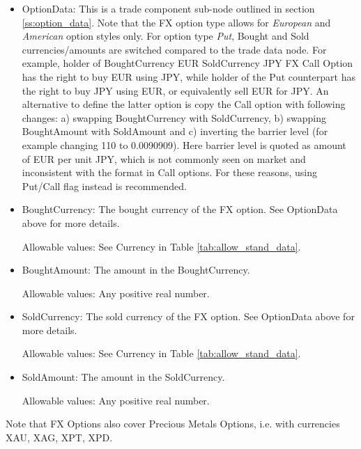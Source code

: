 \begin{itemize}
\item OptionData: This is a trade component sub-node outlined in section \ref{ss:option_data}. Note that the
  FX option type allows for \emph{European} and \emph{American} option styles only. For option type \emph{Put}, Bought and Sold currencies/amounts are switched compared to the trade data node.
For example, holder of BoughtCurrency EUR SoldCurrency JPY FX Call Option has the right to buy EUR using JPY, while
holder of the Put counterpart has the right to buy JPY using EUR, or equivalently sell EUR for JPY. An alternative to define the latter option is copy the Call option with following changes:
a) swapping BoughtCurrency with SoldCurrency, b) swapping BoughtAmount with SoldAmount and c) inverting the barrier level (for example changing 110 to 0.0090909). Here barrier level is
quoted as amount of EUR per unit JPY, which is not commonly seen on market and inconsistent with the format in Call options. For these reasons, using Put/Call flag instead is recommended.

\item BoughtCurrency: The bought currency of the FX option. See OptionData above for more details.

Allowable values:  See Currency in Table \ref{tab:allow_stand_data}.

\item BoughtAmount: The amount in the BoughtCurrency.  

Allowable values:  Any positive real number.

\item SoldCurrency: The sold currency of the FX option. See OptionData above for more details.

Allowable values:  See Currency in Table \ref{tab:allow_stand_data}.

\item SoldAmount: The amount in the SoldCurrency.  

Allowable values:  Any positive real number.

\end{itemize}

Note that FX Options also cover Precious Metals Options, i.e. with
currencies XAU, XAG, XPT, XPD.
